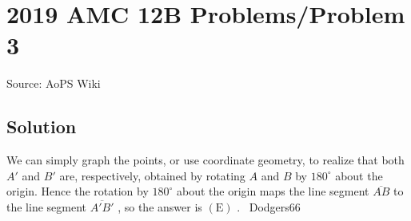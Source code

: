 \documentclass[12pt]{article}
\begin{document}
\section*{{2019 AMC 12B Problems/Problem 3}}
Source: AoPS Wiki

\subsection*{Solution}
We can simply graph the points, or use coordinate geometry, to realize that both $A'$ and $B'$ are, respectively, obtained by rotating $A$ and $B$ by $180^{\circ}$ about the origin. Hence the rotation by $180^{\circ}$ about the origin maps the line segment $\overline{AB}$ to the line segment $\overline{A'B'}$ , so the answer is $\boxed{(\text{E})}$ . ~Dodgers66
\end{document}
